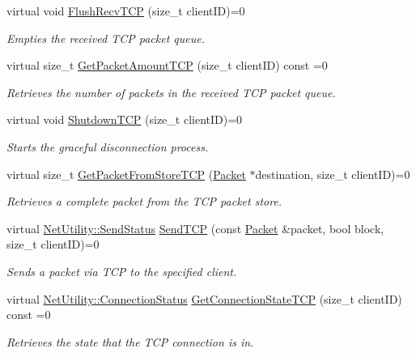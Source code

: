 \begin{DoxyCompactItemize}
virtual void \hyperlink{class_net_instance_t_c_p_a545e0d5c995e0b8ac43c72c786800e0b}{FlushRecvTCP} (size\_\-t clientID)=0
\begin{DoxyCompactList}\small\item\em Empties the received TCP packet queue. \item\end{DoxyCompactList}\item 
virtual size\_\-t \hyperlink{class_net_instance_t_c_p_ac5b7728d5152d157d6b87e60081db168}{GetPacketAmountTCP} (size\_\-t clientID) const =0
\begin{DoxyCompactList}\small\item\em Retrieves the number of packets in the received TCP packet queue. \item\end{DoxyCompactList}\item 
virtual void \hyperlink{class_net_instance_t_c_p_abb23de43a14d5809a79871a05244d17b}{ShutdownTCP} (size\_\-t clientID)=0
\begin{DoxyCompactList}\small\item\em Starts the graceful disconnection process. \item\end{DoxyCompactList}\item 
virtual size\_\-t \hyperlink{class_net_instance_t_c_p_a602f43e93a742836c558e5f086ce52c7}{GetPacketFromStoreTCP} (\hyperlink{class_packet}{Packet} $\ast$destination, size\_\-t clientID)=0
\begin{DoxyCompactList}\small\item\em Retrieves a complete packet from the TCP packet store. \item\end{DoxyCompactList}\item 
virtual \hyperlink{class_net_utility_a8051eca61204ffd818281419bbf44736}{NetUtility::SendStatus} \hyperlink{class_net_instance_t_c_p_a1dd6a5b47974fc6863edde6443f75a32}{SendTCP} (const \hyperlink{class_packet}{Packet} \&packet, bool block, size\_\-t clientID)=0
\begin{DoxyCompactList}\small\item\em Sends a packet via TCP to the specified client. \item\end{DoxyCompactList}\item 
virtual \hyperlink{class_net_utility_a7eae52138f8bd597ffc67ebf07e86b6d}{NetUtility::ConnectionStatus} \hyperlink{class_net_instance_t_c_p_a635bb48421cde040f391c553c437d634}{GetConnectionStateTCP} (size\_\-t clientID) const =0
\begin{DoxyCompactList}\small\item\em Retrieves the state that the TCP connection is in. \item\end{DoxyCompactList}\end{DoxyCompactItemize}
